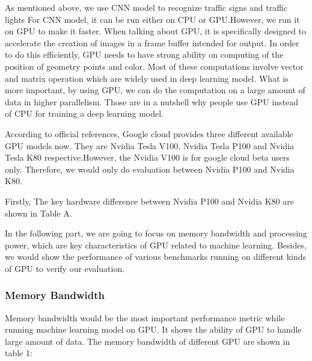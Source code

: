 \documentclass[conference]{IEEEtran}
\begin{document}
As mentioned above, we use CNN model to recognize traffic signs and traffic lights For CNN model, it can be run either on CPU or GPU.However, we run it on GPU to make it faster. When talking about GPU, it is specifically designed to accelerate the creation of images in a frame buffer intended for output. In order to do this efficiently, GPU needs to have strong ability on computing of the position of geometry points and color. Most of these computations involve vector and matrix operation which are widely used in deep learning model. What is more important, by using GPU, we can do the computation on a large amount of data in higher parallelism. Those are in a nutshell why people use GPU instead of CPU for training a deep learning model. 

According to official references, Google cloud provides three different available GPU models now. They are Nvidia Tesla V100, Nvidia Tesla P100 and Nvidia Tesla K80 respective.However, the Nvidia V100 is for google cloud beta users only. Therefore, we would only do evaluation between Nvidia P100 and Nvidia K80.




Firstly, The key hardware difference between Nvidia P100 and Nvidia K80 are shown in Table A.


In the following part, we are going to focus on memory bandwidth and processing power, which are key characteristics of GPU related to machine learning. Besides, we would show the performance of various benchmarks running on different kinds of GPU to verify our evaluation. 

\subsubsection{Memory Bandwidth}
Memory bandwidth would be the most important performance metric while running machine learning model on GPU. It shows the ability of GPU to handle large amount of data. The memory bandwidth of different GPU are shown in table 1:
\end{document}
